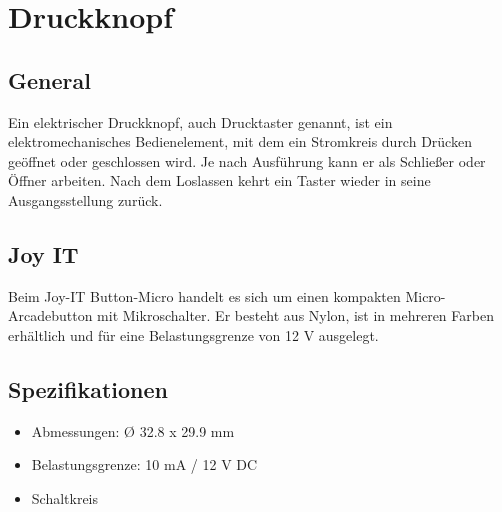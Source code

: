%
%

\chapter{Druckknopf}


\section{General}

Ein elektrischer Druckknopf, auch Drucktaster genannt, ist ein elektromechanisches Bedienelement, mit dem ein Stromkreis durch Drücken geöffnet oder geschlossen wird. Je nach Ausführung kann er als Schließer oder Öffner arbeiten. Nach dem Loslassen kehrt ein Taster wieder in seine Ausgangsstellung zurück. \cite{RS:2026}


\section{Joy IT}
Beim Joy-IT Button-Micro handelt es sich um einen kompakten Micro-Arcadebutton mit Mikroschalter. Er besteht aus Nylon, ist in mehreren Farben erhältlich und für eine Belastungsgrenze von 12 V ausgelegt.\cite{Joy-it:2024}

\section{Spezifikationen}

\begin{itemize}
 \item Abmessungen: Ø 32.8 x 29.9 mm
  \item Belastungsgrenze: 10 mA / 12 V DC \cite{Joy-it:2024}
  \item Schaltkreis
  
\end{itemize}



